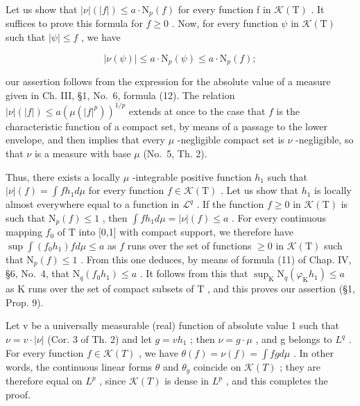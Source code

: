 Let us show that \(|\nu|(|f|) \leqslant a \cdot \mathrm{N}_{p}(f)\) for every function f in \(\mathcal{K}(\mathrm{T})\) . It suffices to prove this formula for \(f \geqslant 0\) . Now, for every function \(\psi\) in \(\mathcal{K}(\mathrm{T})\) such that \(|\psi| \leqslant f\) , we have

\[
| \nu (\psi) | \leqslant a \cdot \mathrm{N} _ {p} (\psi) \leqslant a \cdot \mathrm{N} _ {p} (f);
\]

our assertion follows from the expression for the absolute value of a measure given in Ch. III, §1, No.~6, formula (12). The relation \(|\nu|(|f|) \leqslant a(\mu(|f|^p))^{1/p}\) extends at once to the case that \(f\) is the characteristic function of a compact set, by means of a passage to the lower envelope, and then implies that every \(\mu\) -negligible compact set is \(\nu\) -negligible, so that \(\nu\) is a measure with base \(\mu\) (No.~5, Th. 2).

Thus, there exists a locally \(\mu\) -integrable positive function \(h_1\) such that \(|\nu|(f) = \int fh_1 d\mu\) for every function \(f \in \mathcal{K}(\mathrm{T})\) . Let us show that \(h_1\) is locally almost everywhere equal to a function in \(\mathcal{L}^q\) . If the function \(f \geqslant 0\) in \(\mathcal{K}(\mathrm{T})\) is such that \(\mathrm{N}_p(f) \leqslant 1\) , then \(\int fh_1 d\mu = |\nu|(f) \leqslant a\) . For every continuous mapping \(f_0\) of \(\mathrm{T}\) into {[}0,1{]} with compact support, we therefore have \(\sup \int (f_0 h_1) f d\mu \leqslant a\) as \(f\) runs over the set of functions \(\geqslant 0\) in \(\mathcal{K}(\mathrm{T})\) such that \(\mathrm{N}_p(f) \leqslant 1\) . From this one deduces, by means of formula (11) of Chap. IV, §6, No.~4, that \(\mathrm{N}_q(f_0 h_1) \leqslant a\) . It follows from this that \(\sup_{\mathrm{K}} \mathrm{N}_q (\varphi_{\mathrm{K}} h_1) \leqslant a\) as \(\mathrm{K}\) runs over the set of compact subsets of \(\mathrm{T}\) , and this proves our assertion (§1, Prop. 9).

Let v be a universally measurable (real) function of absolute value 1 such that \(\nu = v \cdot |\nu|\) (Cor. 3 of Th. 2) and let \(g = v h_{1}\) ; then \(\nu = g \cdot \mu\) , and g belongs to \(L^{q}\) . For every function \(f \in \mathcal{K}(T)\) , we have \(\theta(f) = \nu(f) = \int fg d\mu\) . In other words, the continuous linear forms \(\theta\) and \(\theta_{g}\) coincide on \(\mathcal{K}(T)\) ; they are therefore equal on \(L^{p}\) , since \(\mathcal{K}(T)\) is dense in \(L^{p}\) , and this completes the proof.

